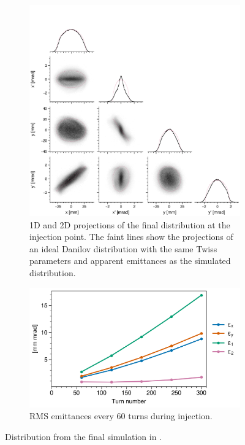 \begin{figure}[!p]
    \centering
    \begin{subfigure}{0.8\textwidth}
        \includegraphics[width=\textwidth]{Images/chapter3/Holmes_corner_compare.png}
        \caption{1D and 2D projections of the final distribution at the injection point. The faint lines show the projections of an ideal Danilov distribution with the same Twiss parameters and apparent emittances as the simulated distribution.}
        \label{fig:Holmes_corner_compare}
    \end{subfigure}
    \vfill
    \vspace*{1.25cm}
    \vfill
    \begin{subfigure}{0.5\textwidth}
        \includegraphics[width=\textwidth]{Images/chapter3/Holmes_emittances.png}
        \caption{RMS emittances every 60 turns during injection.}
        \label{fig:Holmes_emittances}
    \end{subfigure}
    \caption{Distribution from the final simulation in \cite{Holmes2018}.}
    \label{fig:Holmes}
\end{figure}
